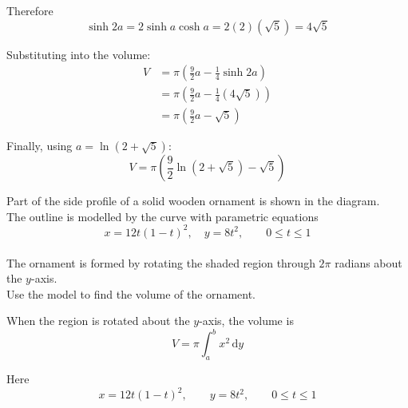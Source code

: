 \documentclass[leqno]{article}
\begin{document}
\begin{enumerate}[
  label=\textbf{\arabic*.},
  leftmargin=*,
  topsep=0pt,
  partopsep=0pt,
  parsep=0pt
]
\begin{djsSolution}
Therefore
\[
\sinh 2a=2\sinh a\cosh a=2(2)(\sqrt5)=4\sqrt5
\]

Substituting into the volume:
\begin{align*}
V
&=\pi\left(\frac92a-\frac14\sinh 2a\right)\\
&=\pi\left(\frac92a-\frac14(4\sqrt5)\right)\\
&=\pi\left(\frac92a-\sqrt5\right)
\end{align*}

Finally, using $a=\ln(2+\sqrt5)$:
\[
V=\pi\left(\frac92\ln(2+\sqrt5)-\sqrt5\right)
\]
\end{djsSolution}


\newpage

\questionitem

\begin{figure}[H]
    \centering
{}
\end{figure}


Part of the side profile of a solid wooden ornament is shown in the diagram. \\
The outline is modelled by the curve with parametric equations
\[
x=12t(1-t)^2,\quad y=8t^2,\qquad 0 \le t \le 1
\] \\
The ornament is formed by rotating the shaded region through $2\pi$ radians about the $y$-axis. \\

Use the model to find the volume of the ornament. 

\vspace*{20pt}

\begin{djsSolution}
When the region is rotated about the $y$-axis, the volume is
\[
V=\pi\int_a^b x^2\,\mathrm{d}y
\]

Here
\[
x=12t(1-t)^2,\qquad y=8t^2,\qquad 0\le t\le 1
\]


\end{djsSolution}
\end{enumerate}
\end{document}
